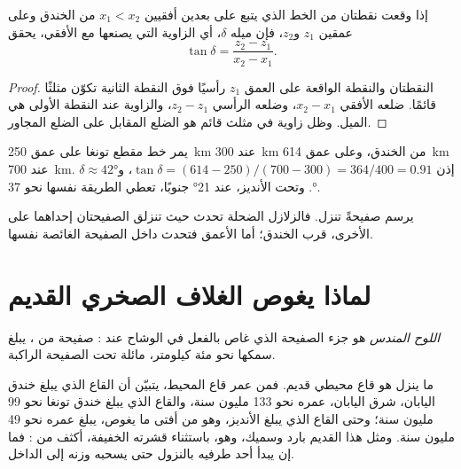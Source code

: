 \begin{proposition}\label{prop:g11:subduction-zones:dip}
إذا وقعت نقطتان من الخط الذي يتبع  على
بعدين أفقيين $x_1 < x_2$ من الخندق وعلى عمقين $z_1$ و$z_2$،
فإن ميله $\delta$، أي الزاوية التي يصنعها مع الأفقي، يحقق
\[
  \tan \delta = \frac{z_2 - z_1}{x_2 - x_1}.
\]
\end{proposition}

\begin{proof}
النقطتان والنقطة الواقعة على العمق $z_1$ رأسيًا فوق النقطة الثانية
تكوّن مثلثًا قائمًا. ضلعه الأفقي $x_2 - x_1$، وضلعه الرأسي
$z_2 - z_1$، والزاوية عند النقطة الأولى هي الميل. وظل
زاوية في مثلث قائم هو الضلع المقابل على الضلع المجاور.
\end{proof}

\begin{example}\label{ex:g11:subduction-zones:dip}
يمر خط مقطع تونغا على عمق \qty{250}{km} عند \qty{300}{km} من
الخندق، وعلى عمق \qty{614}{km} عند \qty{700}{km}. إذن
$\tan\delta = (614 - 250)/(700 - 300) = 364/400 = 0.91$،
و$\delta \approx \ang{42}$. وتحت الأنديز، عند \ang{21} جنوبًا، تعطي الطريقة
نفسها نحو \ang{37}.
\end{example}

يرسم  صفيحةً تنزل. فالزلازل الضحلة
تحدث حيث تنزلق الصفيحتان إحداهما على الأخرى، قرب الخندق؛ أما الأعمق
فتحدث داخل الصفيحة الغائصة نفسها.

\section{لماذا يغوص الغلاف الصخري القديم}

\begin{definition}\label{def:g11:subduction-zones:slab}
\emph{اللوح المندس} هو جزء الصفيحة الذي غاص بالفعل في
الوشاح عند : صفيحة من ، يبلغ سمكها نحو
مئة كيلومتر، مائلة تحت الصفيحة الراكبة.
\end{definition}

ما ينزل هو قاع محيطي قديم. فمن عمر قاع المحيط، يتبيّن أن القاع
الذي يبلغ خندق اليابان، شرق اليابان، عمره نحو 133 مليون سنة،
والقاع الذي يبلغ خندق تونغا نحو 99 مليون سنة؛ وحتى القاع
الذي يبلغ الأنديز، وهو من أفتى ما يغوص، يبلغ عمره نحو 49
مليون سنة. ومثل هذا  القديم بارد وسميك، وهو، باستثناء
قشرته الخفيفة، أكثف من : فما إن يبدأ أحد طرفيه
بالنزول حتى يسحبه وزنه إلى الداخل.

